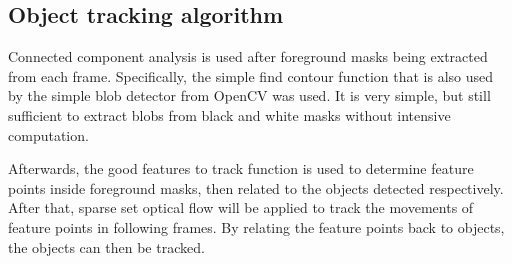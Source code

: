 \subsection{Object tracking algorithm}

Connected component analysis is used after foreground masks being extracted from each frame. Specifically, the simple find contour function that is also used by the simple blob detector from OpenCV was used. It is very simple, but still sufficient to extract blobs from black and white masks without intensive computation.

Afterwards, the good features to track function is used to determine feature points inside foreground masks, then related to the objects detected respectively. After that, sparse set optical flow will be applied to track the movements of feature points in following frames. By relating the feature points back to objects, the objects can then be tracked.

